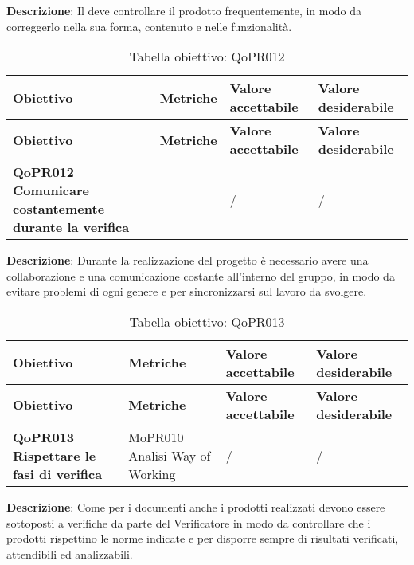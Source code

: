 \documentclass[../piano-di-qualifica.tex]{subfiles}
\begin{document}
        \textbf{Descrizione}: Il  deve controllare il prodotto frequentemente, in modo da correggerlo nella sua forma, contenuto e nelle funzionalità.
        
        \renewcommand{\arraystretch}{2} %
        \begin{longtable}[H]{>{\centering\bfseries}m{5cm} >{\centering}m{5cm} >{\centering}m{2.5cm} >{\centering\arraybackslash}m{2.5cm}}  
            \caption{Tabella obiettivo: QoPR012}%
            \label{tab:obiettivo_qopr012} \\
          \rowcolor{lightgray}
          {\textbf{Obiettivo}} & {\textbf{Metriche}} & {\textbf{Valore accettabile}} & {\textbf{Valore desiderabile}}  \\
          \endfirsthead%
          \rowcolor{lightgray}
          {\textbf{Obiettivo}} & {\textbf{Metriche}} & {\textbf{Valore accettabile}} & {\textbf{Valore desiderabile}}  \\
          \endhead%
          \textbf{QoPR012 Comunicare costantemente durante la verifica} &  & / & / \\
        \end{longtable}
        
        \textbf{Descrizione}: Durante la realizzazione del progetto è necessario avere una collaborazione e una comunicazione costante all'interno del gruppo, in modo da evitare problemi di ogni genere e per sincronizzarsi sul lavoro da svolgere.
        
        \renewcommand{\arraystretch}{2} %
        \begin{longtable}[H]{>{\centering\bfseries}m{5cm} >{\centering}m{5cm} >{\centering}m{2.5cm} >{\centering\arraybackslash}m{2.5cm}}  
            \caption{Tabella obiettivo: QoPR013}%
            \label{tab:obiettivo_qopr013} \\
          \rowcolor{lightgray}
          {\textbf{Obiettivo}} & {\textbf{Metriche}} & {\textbf{Valore accettabile}} & {\textbf{Valore desiderabile}}  \\
          \endfirsthead%
          \rowcolor{lightgray}
          {\textbf{Obiettivo}} & {\textbf{Metriche}} & {\textbf{Valore accettabile}} & {\textbf{Valore desiderabile}}  \\
          \endhead%
          \textbf{QoPR013 Rispettare le fasi di verifica} & MoPR010 Analisi Way of Working & / & / \\
        \end{longtable}
        
        \textbf{Descrizione}: Come per i documenti anche i prodotti realizzati devono essere sottoposti a verifiche da parte del Verificatore in modo da controllare che i prodotti rispettino le norme indicate e per disporre sempre di risultati verificati, attendibili ed analizzabili.
        
\end{document}

